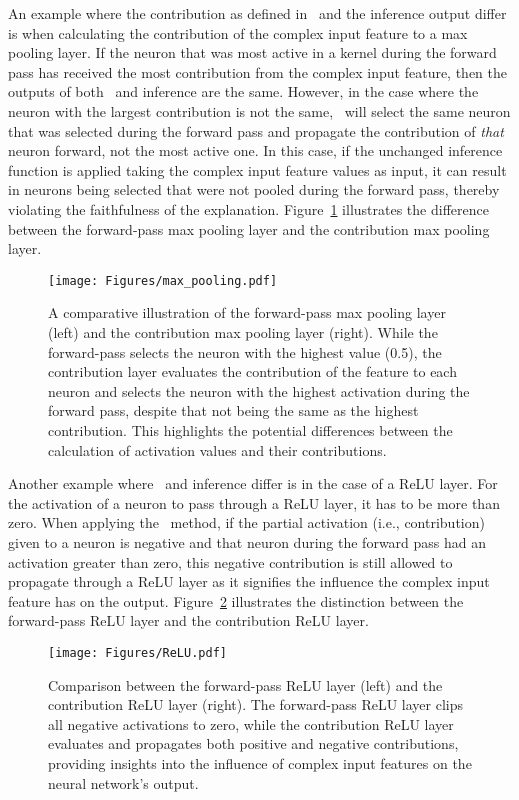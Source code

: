 An example where the contribution as defined in~ and the inference output differ is when calculating the contribution of the complex input feature to a max pooling layer. If the neuron that was most active in a kernel during the forward pass has received the most contribution from the complex input feature, then the outputs of both \CTC\ and inference are the same. However, in the case where the neuron with the largest contribution is not the same, \CTC\ will select the same neuron that was selected during the forward pass and propagate the contribution of \emph{that} neuron forward, not the most active one. In this case, if the unchanged inference function is applied taking the complex input feature values as input, it can result in neurons being selected that were not pooled during the forward pass, thereby violating the faithfulness of the explanation. Figure~\ref{Fig:max_pooling} illustrates the difference between the forward-pass max pooling layer and the contribution max pooling layer.

\begin{figure}[ht!]
	\centering
	\texttt{[image: Figures/max\_pooling.pdf]}
	\caption{A comparative illustration of the forward-pass max pooling layer (left) and the contribution max pooling layer (right). While the forward-pass selects the neuron with the highest value (0.5), the contribution layer evaluates the contribution of the feature to each neuron and selects the neuron with the highest activation during the forward pass, despite that not being the same as the highest contribution. This highlights the potential differences between the calculation of activation values and their contributions.}
	\label{Fig:max_pooling}
\end{figure} 

Another example where \CTC\ and inference differ is in the case of a ReLU layer. For the activation of a neuron to pass through a ReLU layer, it has to be more than zero. When applying the \CTC\ method, if the partial activation (i.e., contribution) given to a neuron is negative and that neuron during the forward pass had an activation greater than zero, this negative contribution is still allowed to propagate through a ReLU layer as it signifies the influence the complex input feature has on the output. Figure~\ref{Fig:Relu} illustrates the distinction between the forward-pass ReLU layer and the contribution ReLU layer.

\begin{figure}[ht!]
	\centering
	\texttt{[image: Figures/ReLU.pdf]}
	\caption{Comparison between the forward-pass ReLU layer (left) and the contribution ReLU layer (right). The forward-pass ReLU layer clips all negative activations to zero, while the contribution ReLU layer evaluates and propagates both positive and negative contributions, providing insights into the influence of complex input features on the neural network's output.}
	\label{Fig:Relu}
\end{figure} 

